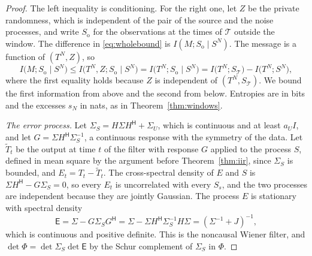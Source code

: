 \documentclass[11pt,onecolumn]{IEEEtran}
\newcommand{\herm}{\mathsf H}
\begin{document}
\begin{proof}
The left inequality is conditioning. For the right one, let $Z$ be the
private randomness, which is independent of the pair of the source and
the noise processes, and write $S_{\mathrm o}$ for the observations at
the times of $\mathcal T$ outside the window. The difference in
\eqref{eq:wholebound} is $I(M;S_{\mathrm o}\mid S^N)$. The message is a
function of $(T^N,Z)$, so
\[
I\bigl(M;S_{\mathrm o}\mid S^N\bigr)\le I\bigl(T^N,Z;S_{\mathrm o}\mid S^N\bigr)
=I\bigl(T^N;S_{\mathrm o}\mid S^N\bigr)=I\bigl(T^N;S_{\mathcal T}\bigr)-I\bigl(T^N;S^N\bigr),
\]
where the first equality holds because $Z$ is independent of
$(T^N,S_{\mathcal T})$. We bound the first information from above and
the second from below. Entropies are in bits and the excesses $s_N$ in
nats, as in Theorem~\ref{thm:windows}.

\emph{The error process.} Let $\Sigma_S=H\Sigma H^{\herm}+\Sigma_U$, which
is continuous and at least $a_UI$, and let
$G=\Sigma H^{\herm}\Sigma_S^{-1}$, a continuous response with the
symmetry of the data. Let $\tilde T_t$ be the output at time $t$ of the
filter with response $G$ applied to the process $S$, defined in mean
square by the argument before Theorem~\ref{thm:iir}, since $\Sigma_S$ is
bounded, and $E_t=T_t-\tilde T_t$. The
cross-spectral density of $E$ and $S$ is
$\Sigma H^{\herm}-G\Sigma_S=0$, so every $E_t$ is uncorrelated with every
$S_s$, and the two processes are independent because they are jointly
Gaussian. The process $E$ is stationary with spectral density
\[
\mathsf E=\Sigma-G\Sigma_SG^{\herm}=\Sigma-\Sigma H^{\herm}\Sigma_S^{-1}H\Sigma=(\Sigma^{-1}+J)^{-1},
\]
which is continuous and positive definite. This is the noncausal Wiener
filter, and $\det\Phi=\det\Sigma_S\det\mathsf E$ by the Schur complement
of $\Sigma_S$ in $\Phi$.


\end{proof}
\end{document}
